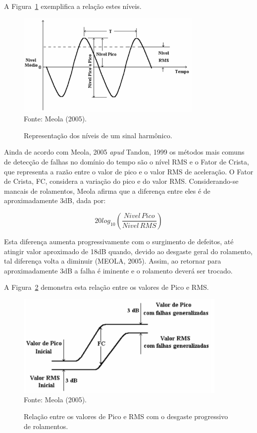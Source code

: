 \documentclass[
	12pt,				
	oneside,			
	a4paper,			
	english,			
	brazil,			
	]{abntex2ppgsi}
\begin{document}
A Figura~\ref{RelacaoSinalHarmonico} exemplifica a relação estes níveis.

\begin{figure}[!htb]
\centering
\caption {Representação dos níveis de um sinal harmônico.}
\includegraphics[width=\textwidth,height=50mm,keepaspectratio]{Figura17} \\
Fonte: Meola (2005).
\label{RelacaoSinalHarmonico}
\end{figure}

Ainda de acordo com Meola, 2005 \textit{apud} Tandon, 1999 os métodos mais comuns de detecção de falhas no domínio do tempo são o nível RMS e o Fator de Crista, que representa a razão entre o valor de pico e o valor RMS de aceleração. O Fator de Crista, FC, considera a variação do pico e do valor RMS. Considerando-se mancais de rolamentos, Meola afirma que a diferença entre eles é de aproximadamente 3dB, dada por:

\begin{equation}
	20log_{10} \left ( \frac{Nivel \,Pico}{Nivel \, RMS} \right )
	\label{eq: Nível de Pico vs RMS}
\end{equation}

Esta diferença aumenta progressivamente com o surgimento de defeitos, até atingir valor aproximado de 18dB quando, devido ao desgaste geral do rolamento, tal diferença volta a diminuir (MEOLA, 2005). Assim, ao retornar para aproximadamente 3dB a falha é iminente e o rolamento deverá ser trocado. 

A Figura~\ref{RelacaoPicoaPicoeRMS} demonstra esta relação entre os valores de Pico e RMS.  

\begin{figure}[!htb]
\centering
\caption {Relação entre os valores de Pico e RMS com o desgaste progressivo de rolamentos.}
\includegraphics[width=\textwidth,height=50mm,keepaspectratio]{Figura18} \\
Fonte: Meola (2005).
\label{RelacaoPicoaPicoeRMS}
\end{figure}	
\end{document}
